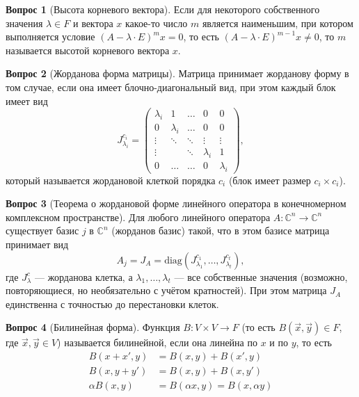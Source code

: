 \documentclass[a4paper,11pt]{article}
\theoremstyle{remark}
\theoremstyle{definition}
\newtheorem{question}{Вопрос}
\begin{document}
\begin{question}[Высота корневого вектора]
Если для некоторого собственного значения \(\lambda \in F\) и вектора \(x\) какое-то число \(m\) является наименьшим, при котором выполняется условие \((A - \lambda \cdot E)^mx = 0\), то есть \((A - \lambda \cdot E)^{m-1}x \neq 0\), то \(m\) называется высотой корневого вектора \(x\).
\end{question}


\begin{question}[Жорданова форма матрицы]
Матрица принимает жорданову форму в том случае, если она имеет блочно-диагональный вид, при этом каждый блок имеет вид
\begin{equation*}
	J^{c_i}_{\lambda_i} = 
	\begin{pmatrix}
		\lambda_i & 1 & \dots & 0 & 0 \\
		0 & \lambda_i & \dots & 0 & 0 \\
		\vdots & \ddots & \ddots & \vdots & \vdots \\
		\vdots & & \ddots & \lambda_i & 1 \\
		0 & \dots & \dots & 0 & \lambda_i
	\end{pmatrix},
\end{equation*}
который называется жордановой клеткой порядка \(c_i\) (блок имеет размер \(c_i \times c_i\)).
\end{question}


\begin{question}[Теорема о жордановой форме линейного оператора в конечномерном комплексном пространстве]
Для любого линейного оператора \(A: \mathbb{C}^n \rightarrow \mathbb{C}^n\) существует базис \(j\) в \(\mathbb{C}^n\) (жорданов базис) такой, что в этом базисе матрица принимает вид
\begin{equation*}
	A_j = J_A = \mathrm{diag}(J_{\lambda_1}^{c_1}, \dots, J_{\lambda_t}^{c_t}),
\end{equation*}
где \(J_{\lambda}^{c}\) --- жорданова клетка, а \(\lambda_1, \dots, \lambda_t\) --- все собственные значения (возможно, повторяющиеся, но необязательно с учётом кратностей). При этом матрица \(J_A\) единственна с точностью до перестановки клеток.
\end{question}


\begin{question}[Билинейная форма]
Функция \(B: V \times V \rightarrow F\) (то есть \(B(\vec{x}, \vec{y}) \in F\), где \(\vec{x}, \vec{y} \in V\)) называется билинейной, если она линейна по \(x\) и по \(y\), то есть
\begin{align*}
	B(x + x', y) &= B(x, y) + B(x', y) \\
	B(x, y + y') &= B(x, y) + B(x, y') \\
	\alpha{}B(x, y) &= B(\alpha{}x, y) = B(x, \alpha{}y)
\end{align*}
\end{question}
\end{document}
